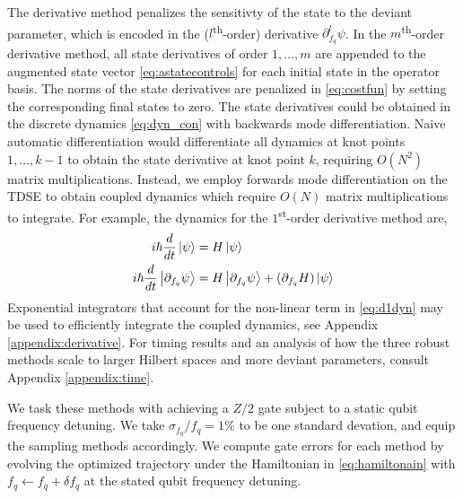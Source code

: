 The derivative method penalizes the sensitivty of the state
to the deviant parameter, which is encoded in the ($l$\textsuperscript{th}-order)
derivative $\partial_{f_{q}}^{l} \psi$. In the $m$\textsuperscript{th}-order
derivative method, all state derivatives of order $1, \dots, m$
are appended to the augmented state vector \eqref{eq:astatecontrols}
for each initial state in the operator basis.
The norms of the state derivatives are penalized
in \eqref{eq:costfun} by setting the corresponding final states to zero.
The state derivatives could be obtained in the discrete dynamics \eqref{eq:dyn_con}
with backwards mode differentiation.
Naive automatic differentiation
would differentiate all dynamics at knot points
$1, \dots, k - 1$ to obtain the state derivative at knot point $k$, requiring
$O(N^{2})$ matrix multiplications. Instead, we 
employ forwards mode differentiation on the TDSE to obtain coupled dynamics
which require $O(N)$ matrix multiplications to integrate.
For example, the dynamics for the $1$\textsuperscript{st}-order derivative method are,
\begin{align}
  i \hbar \frac{d}{dt} \ket{\psi} &= H \ket{\psi}\\
  i \hbar \frac{d}{dt} \ket{\partial_{f_{q}}\psi} &=
  H \ket{\partial_{f_{q}} \psi} +
  (\partial_{f_{q}} H) \ket{\psi}
  \label{eq:d1dyn}
\end{align}
Exponential integrators that account for the non-linear
term in \eqref{eq:d1dyn} may be used to efficiently integrate the coupled dynamics,
see Appendix \ref{appendix:derivative}. For timing results
and an analysis of how the three robust methods scale to larger Hilbert spaces
and more deviant parameters,
consult Appendix \ref{appendix:time}.

We task these methods with achieving
a $Z/2$ gate subject to a static qubit frequency detuning.
We take $\sigma_{f_{q}} / f_{q} = 1\%$ to be one standard devation, and equip
the sampling methods accordingly. We compute gate errors for each method
by evolving the optimized trajectory under the Hamiltonian in \eqref{eq:hamiltonain}
with $f_{q} \gets f_{q} + \delta f_{q}$ at the stated qubit frequency detuning.

